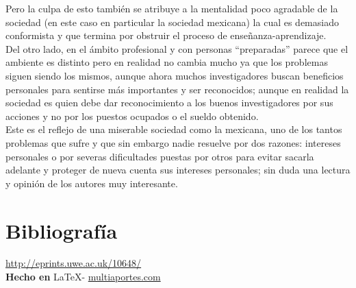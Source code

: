 \documentclass{article}
\begin{document}
{Pero la culpa de esto también se atribuye a la mentalidad poco agradable de la sociedad (en este caso en particular la sociedad mexicana) la cual es demasiado conformista y que termina por obstruir el proceso de enseñanza-aprendizaje.
\\

Del otro lado, en el ámbito profesional y con personas “preparadas” parece que el ambiente es distinto pero en realidad no cambia mucho ya que los problemas siguen siendo los mismos, aunque ahora muchos investigadores buscan beneficios personales para sentirse más importantes y ser reconocidos; aunque en realidad la sociedad es quien debe dar reconocimiento a los buenos investigadores por sus acciones y no por los puestos ocupados o el sueldo obtenido.
\\

Este es el reflejo de una miserable sociedad como la mexicana, uno de los tantos problemas que sufre y que sin embargo nadie resuelve por dos razones: intereses personales o por severas dificultades puestas por otros para evitar sacarla adelante y proteger de nueva cuenta sus intereses personales; sin duda una lectura y opinión de los autores muy interesante.
}

\vspace{1cm}

\section*{Bibliograf\'ia}

\noindent \url{http://eprints.uwe.ac.uk/10648/}
\\

\large{\hfill \textbf{Hecho en } \LaTeX - \url{multiaportes.com}}
\end{document}
